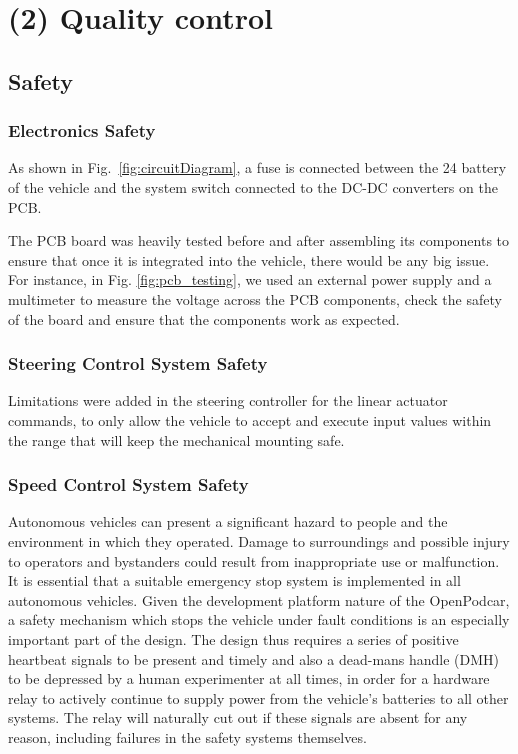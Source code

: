 \documentclass[a4paper]{article}
\begin{document}
\section{(2) Quality control}\label{h.f8237gmzmwc6}

\subsection{Safety}\label{h.v60aduckfisj}

\subsubsection{Electronics Safety}

As shown in Fig.~\ref{fig:circuitDiagram}, a fuse is connected between the 24 battery of the vehicle and the system switch connected to the DC-DC converters on the PCB.   

The PCB board was heavily tested before and after assembling its components to ensure that once it is integrated into the vehicle, there would be any big issue. For instance, in Fig. \ref{fig:pcb_testing}, we used an external power supply and a multimeter to measure the voltage across the PCB components, check the safety of the board and ensure that the components work as expected.  


\subsubsection{Steering Control System Safety}

Limitations were added in the steering controller for the linear actuator commands, to only allow the vehicle to accept and execute input values within the range that will keep the mechanical mounting safe.


\subsubsection{Speed Control System Safety}

Autonomous vehicles can present a significant hazard to people and the environment in which they operated. Damage to surroundings and possible injury to operators and bystanders could result from inappropriate use or malfunction. It is essential that a suitable emergency stop system is implemented in all autonomous vehicles. Given the development platform nature of the OpenPodcar, a safety mechanism which stops the vehicle under fault conditions is an especially important part of the design. The design thus requires a series of positive heartbeat signals to be present and timely and also a dead-mans handle (DMH) to be depressed by a human experimenter at all times, in order for a hardware relay to actively continue to supply power from the vehicle’s batteries to all other systems. The relay will naturally cut out if these signals are absent for any reason, including failures in the safety systems themselves.
\end{document}
